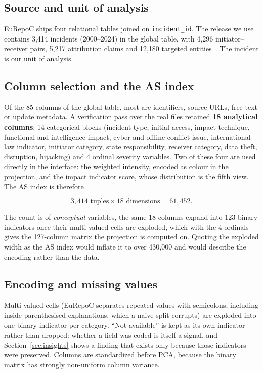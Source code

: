 \documentclass[conference]{IEEEtran}
\begin{document}
\subsection{Source and unit of analysis}

EuRepoC ships four relational tables joined on \texttt{incident\_id}. The release we use
contains 3{,}414 incidents (2000--2024) in the global table, with 4{,}296
initiator--receiver pairs, 5{,}217 attribution claims and 12{,}180 targeted
entities~\cite{eurepoc-data}. The incident is our unit of analysis.

\subsection{Column selection and the AS index}

Of the 85 columns of the global table, most are identifiers, source URLs, free text or
update metadata. A verification pass over the real files retained \textbf{18 analytical
columns}: 14 categorical blocks (incident type, initial access, impact technique,
functional and intelligence impact, cyber and offline conflict issue, international-law
indicator, initiator category, state responsibility, receiver category, data theft,
disruption, hijacking) and 4 ordinal severity variables. Two of these four are used directly in the interface: the weighted intensity, encoded as colour in the projection, and the impact indicator score, whose distribution is the fifth view. The AS index is therefore

\[
3{,}414 \text{ tuples} \times 18 \text{ dimensions} = 61{,}452 .
\]

The count is of \emph{conceptual} variables, the same
18 columns expand into 123 binary indicators once their multi-valued cells are exploded,
which with the 4 ordinals gives the 127-column matrix the projection is computed on.
Quoting the exploded width as the AS index would inflate it to over 430{,}000 and would
describe the encoding rather than the data.

\subsection{Encoding and missing values}

Multi-valued cells (EuRepoC separates repeated values with semicolons, including inside
parenthesised explanations, which a naive split corrupts) are exploded into one binary
indicator per category. ``Not available'' is kept as its own indicator rather than
dropped: whether a field was coded is itself a signal, and Section~\ref{sec:insights}
shows a finding that exists only because those indicators were preserved. Columns are
standardized before PCA, because the binary matrix has strongly non-uniform column
variance.
\end{document}

